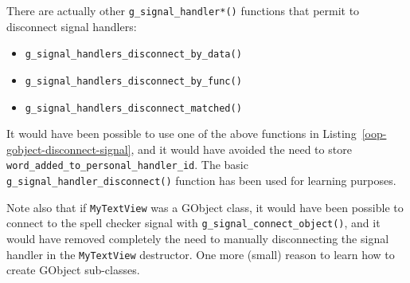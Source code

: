 \vspace{0.7cm}


There are actually other \lstinline{g_signal_handler*()} functions that permit to disconnect signal handlers:
\begin{itemize}
  \item \lstinline{g_signal_handlers_disconnect_by_data()}
  \item \lstinline{g_signal_handlers_disconnect_by_func()}
  \item \lstinline{g_signal_handlers_disconnect_matched()}
\end{itemize}

It would have been possible to use one of the above functions in Listing~\ref{oop-gobject-disconnect-signal}, and it would have avoided the need to store \lstinline{word_added_to_personal_handler_id}. The basic \lstinline{g_signal_handler_disconnect()} function has been used for learning purposes.

Note also that if \lstinline{MyTextView} was a GObject class, it would have been possible to connect to the spell checker signal with \lstinline{g_signal_connect_object()}, and it would have removed completely the need to manually disconnecting the signal handler in the \lstinline{MyTextView} destructor. One more (small) reason to learn how to create GObject sub-classes.


